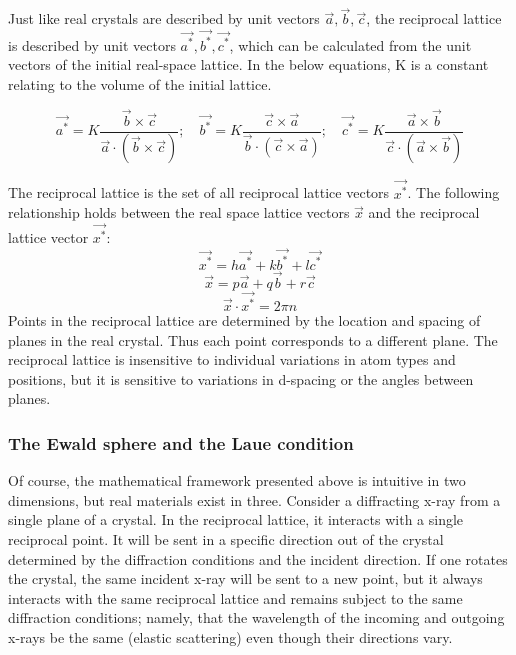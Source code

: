 Just like real crystals are described by unit vectors $\vec{a},\vec{b},\vec{c}$, the reciprocal lattice is described by unit vectors $\vec{a^*},\vec{b^*},\vec{c^*}$, which can be calculated from the unit vectors of the initial real-space lattice. In the below equations, K is a constant relating to the volume of the initial lattice.

\begin{equation}
    \vec{a^*}=K\frac{\vec{b}\times\vec{c}}{\vec{a}\cdot(\vec{b}\times\vec{c})};\quad
    \vec{b^*}=K\frac{\vec{c}\times\vec{a}}{\vec{b}\cdot(\vec{c}\times\vec{a})};\quad
    \vec{c^*}=K\frac{\vec{a}\times\vec{b}}{\vec{c}\cdot(\vec{a}\times\vec{b})}
    \label{RecipLatVecs}
\end{equation}

The reciprocal lattice is the set of all reciprocal lattice vectors $\vec{x^*}$. The following relationship holds between the real space lattice vectors $\vec{x}$ and the reciprocal lattice vector $\vec{x^*}$:
\begin{equation}
    \vec{x^*}=h\vec{a^*}+k\vec{b^*}+l\vec{c^*}
    \label{RecipLatVecX}
\end{equation}
\begin{equation}
    \vec{x}=p\vec{a}+q\vec{b}+r\vec{c}
    \label{RealLatVecX}
\end{equation}
\begin{equation}
    \vec{x}\cdot\vec{x^*}=2\pi n
    \label{RecipRealLatVecXRelation}
\end{equation}
Points in the reciprocal lattice are determined by the location and spacing of planes in the real crystal. Thus each point corresponds to a different plane. The reciprocal lattice is insensitive to individual variations in atom types and positions, but it is sensitive to variations in d-spacing or the angles between planes.

\subsubsection{The Ewald sphere and the Laue condition}
Of course, the mathematical framework presented above is intuitive in two dimensions, but real materials exist in three. Consider a diffracting x-ray from a single plane of a crystal. In the reciprocal lattice, it interacts with a single reciprocal point. It will be sent in a specific direction out of the crystal determined by the diffraction conditions and the incident direction. If one rotates the crystal, the same incident x-ray will be sent to a new point, but it always interacts with the same reciprocal lattice and remains subject to the same diffraction conditions; namely, that the wavelength of the incoming and outgoing x-rays be the same (elastic scattering) even though their directions vary.

